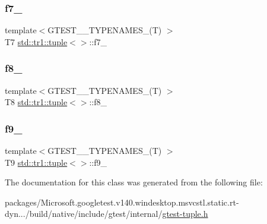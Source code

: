 \mbox{\label{classstd_1_1tr1_1_1tuple_a7c28780e616d382833e844f62672c6bc}} 
\subsubsection{\texorpdfstring{f7\_}{f7\_}}
{\footnotesize\ttfamily template$<$G\+T\+E\+S\+T\+\_\+\_\+\+T\+Y\+P\+E\+N\+A\+M\+E\+S\+\_\+(\+T) $>$ \\
T7 \mbox{\hyperlink{classstd_1_1tr1_1_1tuple}{std\+::tr1\+::tuple}}$<$$>$\+::f7\+\_\+}

\mbox{\label{classstd_1_1tr1_1_1tuple_ae859012c83943e54e035a4a32089ccb6}} 
\subsubsection{\texorpdfstring{f8\_}{f8\_}}
{\footnotesize\ttfamily template$<$G\+T\+E\+S\+T\+\_\+\_\+\+T\+Y\+P\+E\+N\+A\+M\+E\+S\+\_\+(\+T) $>$ \\
T8 \mbox{\hyperlink{classstd_1_1tr1_1_1tuple}{std\+::tr1\+::tuple}}$<$$>$\+::f8\+\_\+}

\mbox{\label{classstd_1_1tr1_1_1tuple_a336d5e582fd34e45ec88c78d473671dd}} 
\subsubsection{\texorpdfstring{f9\_}{f9\_}}
{\footnotesize\ttfamily template$<$G\+T\+E\+S\+T\+\_\+\_\+\+T\+Y\+P\+E\+N\+A\+M\+E\+S\+\_\+(\+T) $>$ \\
T9 \mbox{\hyperlink{classstd_1_1tr1_1_1tuple}{std\+::tr1\+::tuple}}$<$$>$\+::f9\+\_\+}



The documentation for this class was generated from the following file\+:\begin{DoxyCompactItemize}
\item 
packages/\+Microsoft.\+googletest.\+v140.\+windesktop.\+msvcstl.\+static.\+rt-\/dyn.../build/native/include/gtest/internal/\mbox{\hyperlink{gtest-tuple_8h}{gtest-\/tuple.\+h}}\end{DoxyCompactItemize}
